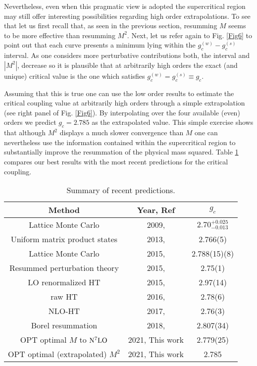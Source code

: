 \documentclass[a4paper,11pt]{article}
\begin{document}
Nevertheless, even when this pragmatic view is adopted the supercritical region may still offer  interesting possibilities regarding high order extrapolations.  To see that let us first recall that, as seen in the previous section, resumming $M$ seems to be more effective than resumming $M^2$.  Next, let us refer again to Fig. \ref {Fig6} to point out that each curve presents a minimum lying within the $g_c^{(w)}-g_c^{(s)}$ interval. As one considers more perturbative contributions  both, the interval and $|M^2|$, decrease so it is plausible that at arbitrarily high orders the exact (and unique) critical value is the one  which satisfies  $g_c^{(w)} = g_c^{(s)} \equiv g_c$. 

Assuming that this is true one can use the low order results to estimate the critical coupling value at arbitrarily high orders  through a simple extrapolation (see right panel of Fig. \ref{Fig6}). By  interpolating over the four available (even) orders we  predict $g_c = 2.785$ as the extrapolated value. This simple exercise shows that although $M^2$ displays a much slower convergence than $M$ one can nevertheless use the information contained within the supercritical region to substantially improve the resummation of the physical mass squared.  Table \ref{tabela4} compares our best results with the most recent predictions for the critical coupling.

\begin{table}[ht!]
    \centering
    \begin{tabular}{ |c|c|c| }
        \hline
        Method & Year, Ref & $g_c$  \\
        \hline\hline
        Lattice Monte Carlo & 2009, \cite{lattice5} & $2.70^{+0.025}_{-0.013}$   \\ 
        Uniform matrix product states & 2013, \cite{lattice2} & 2.766(5)    \\
        Lattice Monte Carlo & 2015, \cite{lattice1} & 2.788(15)(8)  \\
        Resummed perturbation theory & 2015, \cite{rpt} & 2.75(1) \\
        \hline
        LO renormalized HT & 2015, \cite{hamilton1} & 2.97(14) \\
        raw HT & 2016, \cite{hamilton3} & 2.78(6) \\
        NLO-HT & 2017, \cite{hamilton7} & 2.76(3)\\
        \hline
        Borel resummation & 2018, \cite{serone1} & 2.807(34) \\
        \hline
        OPT optimal $M$ to ${\rm N}^7{\rm LO}$ & 2021, This work & 2.779(25)\\
        OPT optimal (extrapolated) $M^2$   & 2021, This work & 2.785\\
        \hline
    \end{tabular}
    \caption{Summary of recent predictions.}
    \label{tabela4}
    \end{table}
\end{document}
